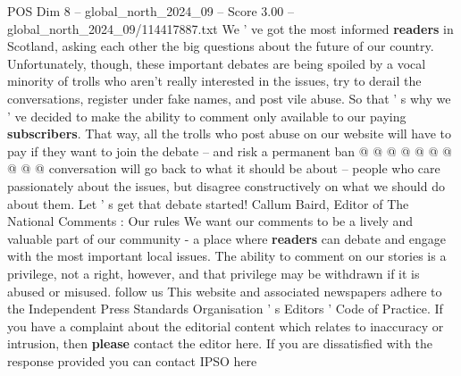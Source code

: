\begin{textsample}{POS Dim 8 – global\_north\_2024\_09 – Score 3.00 – global\_north\_2024\_09/114417887.txt}
We ' ve got the most informed \textbf{readers} in Scotland, asking each other the big questions about the future of our country.
Unfortunately, though, these important debates are being spoiled by a vocal minority of trolls who aren't really interested in the issues, try to derail the conversations, register under fake names, and post vile abuse.
So that ' s why we ' ve decided to make the ability to comment only available to our paying \textbf{subscribers}.
That way, all the trolls who post abuse on our website will have to pay if they want to join the debate -- and risk a permanent ban @ @ @ @ @ @ @ @ @ @ conversation will go back to what it should be about -- people who care passionately about the issues, but disagree constructively on what we should do about them.
Let ' s get that debate started!
Callum Baird, Editor of The National Comments : Our rules We want our comments to be a lively and valuable part of our community - a place where \textbf{readers} can debate and engage with the most important local issues.
The ability to comment on our stories is a privilege, not a right, however, and that privilege may be withdrawn if it is abused or misused. follow us This website and associated newspapers adhere to the Independent Press Standards Organisation ' s Editors ' Code of Practice.
If you have a complaint about the editorial content which relates to inaccuracy or intrusion, then \textbf{please} contact the editor here.
If you are dissatisfied with the response provided you can contact IPSO here

\end{textsample}
